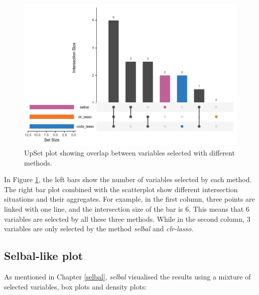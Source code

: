 \documentclass[openany]{book}
\newenvironment{Shaded}{\begin{snugshade}}{\end{snugshade}}
\newcommand{\KeywordTok}[1]{\textcolor[rgb]{0.13,0.29,0.53}{\textbf{#1}}}
\newcommand{\DataTypeTok}[1]{\textcolor[rgb]{0.13,0.29,0.53}{#1}}
\newcommand{\StringTok}[1]{\textcolor[rgb]{0.31,0.60,0.02}{#1}}
\newcommand{\CommentTok}[1]{\textcolor[rgb]{0.56,0.35,0.01}{\textit{#1}}}
\newcommand{\OtherTok}[1]{\textcolor[rgb]{0.56,0.35,0.01}{#1}}
\newcommand{\OperatorTok}[1]{\textcolor[rgb]{0.81,0.36,0.00}{\textbf{#1}}}
\newcommand{\NormalTok}[1]{#1}
\begin{document}
\begin{figure}

{\centering \includegraphics[width=1\linewidth]{./Generated_plots/upsetCD-1} 

}

\caption{UpSet plot showing overlap between variables selected with different methods.}\label{fig:upsetCD}
\end{figure}

In Figure \ref{fig:upsetCD}, the left bars show the number of variables
selected by each method. The right bar plot combined with the
scatterplot show different intersection situations and their aggregates.
For example, in the first column, three points are linked with one line,
and the intersection size of the bar is 6. This means that 6 variables
are selected by all these three methods. While in the second column, 3
variables are only selected by the method \emph{selbal} and
\emph{clr-lasso}.

\subsection{Selbal-like plot}\label{selbal-like-plot}

As mentioned in Chapter \ref{selbal}, \emph{selbal} visualised the
results using a mixture of selected variables, box plots and density
plots:

\begin{Shaded}
\end{Shaded}
\end{document}

